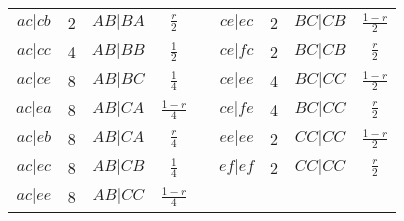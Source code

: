 \begin{center}
\begin{tabular}{ccccccccc}
$ac|cb$ & 2 & $AB|BA$ & $\frac{r}{2}$ &&
$ce|ec$ & 2 & $BC|CB$ & $\frac{1-r}{2}$ \\ 
$ac|cc$ & 4 & $AB|BB$ & $\frac{1}{2}$ &&
$ce|fc$ & 2 & $BC|CB$ & $\frac{r}{2}$ \\ 
$ac|ce$ & 8 & $AB|BC$ & $\frac{1}{4}$ &&
$ce|ee$ & 4 & $BC|CC$ & $\frac{1-r}{2}$ \\ 
$ac|ea$ & 8 & $AB|CA$ & $\frac{1-r}{4}$ &&
$ce|fe$ & 4 & $BC|CC$ & $\frac{r}{2}$ \\ 
$ac|eb$ & 8 & $AB|CA$ & $\frac{r}{4}$ &&
$ee|ee$ & 2 & $CC|CC$ & $\frac{1-r}{2}$ \\ 
$ac|ec$ & 8 & $AB|CB$ & $\frac{1}{4}$ &&
$ef|ef$ & 2 & $CC|CC$ & $\frac{r}{2}$ \\ 
\cline{6-9}
$ac|ee$ & 8 & $AB|CC$ & $\frac{1-r}{4}$ &&
& & &\\ 
\cline{1-4}
\end{tabular} \end{center}
